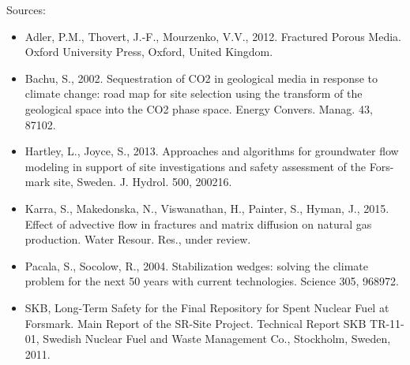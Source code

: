 \documentclass[letterpaper,10pt,english]{sphinxmanual}
\begin{document}
Sources:
\begin{itemize}
\item {} 
Adler, P.M., Thovert, J.-F., Mourzenko, V.V., 2012. Fractured Porous Media. Oxford University Press, Oxford, United Kingdom.

\item {} 
Bachu, S., 2002. Sequestration of CO2 in geological media in response to climate change: road map for site selection using the transform of the geological space into the CO2 phase space. Energy Convers. Manag. 43, 87\textendash{}102.

\item {} 
Hartley, L., Joyce, S., 2013. Approaches and algorithms for groundwater flow modeling in support of site investigations and safety assessment of the Fors- mark site, Sweden. J. Hydrol. 500, 200\textendash{}216.

\item {} 
Karra, S., Makedonska, N., Viswanathan, H., Painter, S., Hyman, J., 2015. Effect of advective flow in fractures and matrix diffusion on natural gas production. Water Resour. Res., under review.

\item {} 
Pacala, S., Socolow, R., 2004. Stabilization wedges: solving the climate problem for the next 50 years with current technologies. Science 305, 968\textendash{}972.

\item {} 
SKB, Long-Term Safety for the Final Repository for Spent Nuclear Fuel at Forsmark. Main Report of the SR-Site Project. Technical Report SKB TR-11-01, Swedish Nuclear Fuel and Waste Management Co., Stockholm, Sweden, 2011.

\end{itemize}
\end{document}

